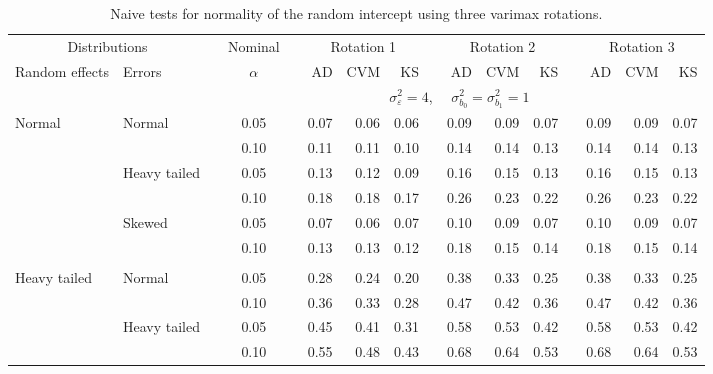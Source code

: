 \documentclass{article} %
\begin{document}
\begin{table}[ht]
\begin{scriptsize}
\begin{center}
\begin{tabular}{ll p{.1cm} c p{.1cm} rrr p{.1cm} rrr p{.1cm} rrr}
   \hline
\end{tabular}
\end{center}
\end{scriptsize}
\end{table}


\begin{table}[ht]
\caption{Naive tests for normality of the random intercept using three varimax rotations.}
\begin{scriptsize}
\begin{center}
\begin{tabular}{ll p{.1cm} c p{.1cm} rrr p{.1cm} rrr p{.1cm} rrr}
  \hline
  \multicolumn{2}{c}{Distributions}& & Nominal & &  \multicolumn{3}{c}{Rotation 1} & & \multicolumn{3}{c}{Rotation 2} & & \multicolumn{3}{c}{Rotation 3}\\ \cline{1-2} \cline{6-8} \cline{10-12} \cline{14-16}
  Random effects & Errors & & $\alpha$ & & AD & CVM & KS & & AD & CVM & KS & & AD & CVM & KS \\ 
   \hline
& && && \multicolumn{9}{c}{$\sigma_{\varepsilon}^2 = 4$, \ \ $\sigma_{b_0}^2 = \sigma_{b_1}^2 = 1$} \\ \cline{6-16}
Normal       & Normal       && 0.05 &&  0.07 & 0.06 & 0.06 && 0.09 & 0.09 & 0.07 && 0.09 & 0.09 & 0.07 \\ 
             &              && 0.10 &&  0.11 & 0.11 & 0.10 && 0.14 & 0.14 & 0.13 && 0.14 & 0.14 & 0.13 \\ 
             & Heavy tailed && 0.05 &&  0.13 & 0.12 & 0.09 && 0.16 & 0.15 & 0.13 && 0.16 & 0.15 & 0.13 \\ 
             &              && 0.10 &&  0.18 & 0.18 & 0.17 && 0.26 & 0.23 & 0.22 && 0.26 & 0.23 & 0.22 \\ 
             & Skewed       && 0.05 &&  0.07 & 0.06 & 0.07 && 0.10 & 0.09 & 0.07 && 0.10 & 0.09 & 0.07 \\ 
             &              && 0.10 &&  0.13 & 0.13 & 0.12 && 0.18 & 0.15 & 0.14 && 0.18 & 0.15 & 0.14 \\
             &&&&&&&&&&&&&&&\\ 
Heavy tailed & Normal       && 0.05 &&  0.28 & 0.24 & 0.20 && 0.38 & 0.33 & 0.25 && 0.38 & 0.33 & 0.25 \\ 
             &              && 0.10 &&  0.36 & 0.33 & 0.28 && 0.47 & 0.42 & 0.36 && 0.47 & 0.42 & 0.36 \\ 
             & Heavy tailed && 0.05 &&  0.45 & 0.41 & 0.31 && 0.58 & 0.53 & 0.42 && 0.58 & 0.53 & 0.42 \\ 
             &              && 0.10 &&  0.55 & 0.48 & 0.43 && 0.68 & 0.64 & 0.53 && 0.68 & 0.64 & 0.53 \\ 

\end{tabular}
\end{center}
\end{scriptsize}
\end{table}
\end{document}
